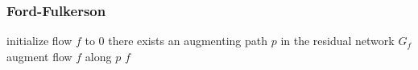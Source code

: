 
\subsubsection{Ford-Fulkerson}
\begin{codebox}
\li initialize flow $f$ to 0
\li \While there exists an augmenting path $p$ in the residual network $G_f$
    \Do
\li      augment flow $f$ along $p$
    \End
\li \Return $f$
\end{codebox}